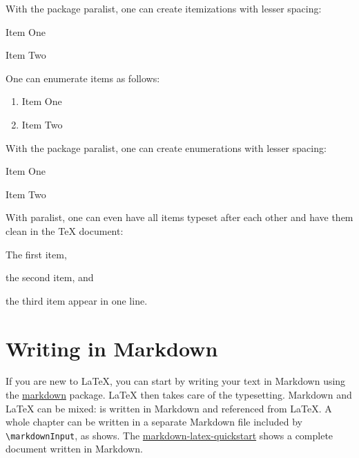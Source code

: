 With the package paralist, one can create itemizations with lesser spacing:

\begin{ltgexample}
\begin{compactitem}
  \item Item One
  \item Item Two
\end{compactitem}
\end{ltgexample}

One can enumerate items as follows:

\begin{ltgexample}
\begin{enumerate}
  \item Item One
  \item Item Two
\end{enumerate}
\end{ltgexample}

With the package paralist, one can create enumerations with lesser spacing:

\begin{ltgexample}
\begin{compactenum}
  \item Item One
  \item Item Two
\end{compactenum}
\end{ltgexample}

With paralist, one can even have all items typeset after each other and have them clean in the TeX document:

\begin{ltgexample}
\begin{inparaenum}
  \item The first item,
  \item the second item, and
  \item the third item appear in one line.
\end{inparaenum}
\end{ltgexample}

\section{Writing in Markdown}\label{sec:markdown}

\ifluatex
  If you are new to \LaTeX{}, you can start by writing your text in Markdown using the \href{https://ctan.org/pkg/markdown}{markdown} package.
  \LaTeX{} then takes care of the typesetting.
  Markdown and \LaTeX{} can be mixed:
   is written in Markdown and referenced from \LaTeX{}.
  A whole chapter can be written in a separate Markdown file included by \verb|\markdownInput|, as  shows.
  The \href{https://github.com/latextemplates/markdown-latex-quickstart}{markdown-latex-quickstart} shows a complete document written in Markdown.


